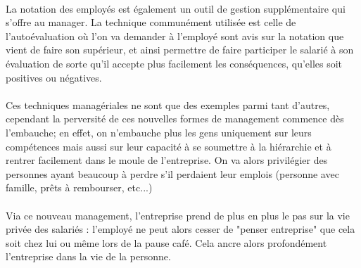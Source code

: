 \documentclass{report}
\begin{document}
		\paragraph{}
			La notation des employés est également un outil de gestion supplémentaire qui s'offre au manager. La technique communément utilisée est celle de l'autoévaluation où l'on va demander à l'employé sont avis sur la notation que vient de faire son supérieur, et ainsi permettre de faire participer le salarié à son évaluation de sorte qu'il accepte plus facilement les conséquences, qu'elles soit positives ou négatives.
		\paragraph{}
			Ces techniques managériales ne sont que des exemples parmi tant d'autres, cependant la perversité de ces nouvelles formes de management commence dès l'embauche; en effet, on n'embauche plus les gens uniquement sur leurs compétences mais aussi sur leur capacité à se soumettre à la hiérarchie et à rentrer facilement dans le moule de l'entreprise. On va alors privilégier des personnes ayant beaucoup à perdre s'il perdaient leur emplois (personne avec famille, prêts à rembourser, etc...)
		\paragraph{}
			Via ce nouveau management, l'entreprise prend de plus en plus le pas sur la vie privée des salariés : l'employé ne peut alors cesser de "penser entreprise" que cela soit chez lui ou même lors de la pause café. Cela ancre alors profondément l'entreprise dans la vie de la personne.

\end{document}
